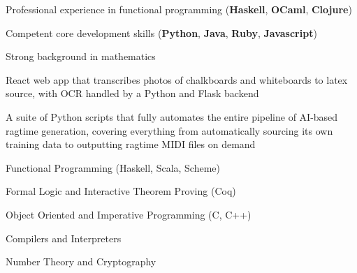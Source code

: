 
\begin{tightitemize}
    \item Professional experience in functional programming (\textbf{Haskell}, 
        \textbf{OCaml},
        \textbf{Clojure})
    \item Competent core development skills (\textbf{Python}, \textbf{Java}, 
    \textbf{Ruby}, \textbf{Javascript})
    \item Strong background in mathematics
\end{tightitemize}

\bigskip
{}

React web app that transcribes photos of chalkboards and whiteboards to latex 
source, with OCR handled by a Python and Flask backend

\divider

A suite of Python scripts that fully automates the entire pipeline of
AI-based ragtime generation, covering everything from automatically sourcing 
its own training data to outputting ragtime MIDI files on demand

\bigskip
{}

\smallskip
{}

\divider


\divider



{}
\begin{tightitemize}
    \item Functional Programming (Haskell, Scala, Scheme) 
    \item Formal Logic and Interactive Theorem Proving (Coq)
    \item Object Oriented and Imperative Programming (C, C++)
    \item Compilers and Interpreters
    \item Number Theory and Cryptography
\end{tightitemize}
\bigskip



